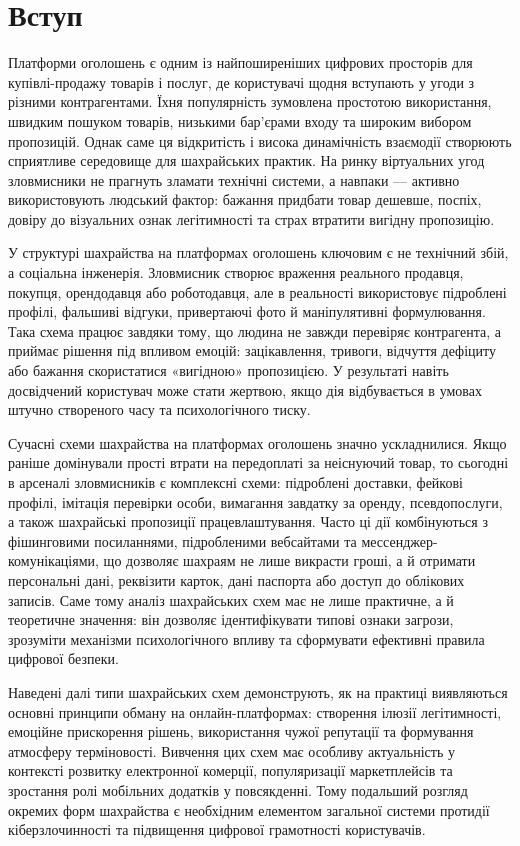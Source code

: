 ﻿\chapter*{Вступ}

\vspace{-1.2em} %


Платформи оголошень є одним із найпоширеніших цифрових просторів для купівлі-продажу товарів і послуг, де користувачі щодня вступають у угоди з різними контрагентами. Їхня популярність зумовлена простотою використання, швидким пошуком товарів, низькими бар’єрами входу та широким вибором пропозицій. Однак саме ця відкритість і висока динамічність взаємодії створюють сприятливе середовище для шахрайських практик. На ринку віртуальних угод зловмисники не прагнуть зламати технічні системи, а навпаки — активно використовують людський фактор: бажання придбати товар дешевше, поспіх, довіру до візуальних ознак легітимності та страх втратити вигідну пропозицію.

У структурі шахрайства на платформах оголошень ключовим є не технічний збій, а соціальна інженерія. Зловмисник створює враження реального продавця, покупця, орендодавця або роботодавця, але в реальності використовує підроблені профілі, фальшиві відгуки, привертаючі фото й маніпулятивні формулювання. Така схема працює завдяки тому, що людина не завжди перевіряє контрагента, а приймає рішення під впливом емоцій: зацікавлення, тривоги, відчуття дефіциту або бажання скористатися «вигідною» пропозицією. У результаті навіть досвідчений користувач може стати жертвою, якщо дія відбувається в умовах штучно створеного часу та психологічного тиску.

\newpage

Сучасні схеми шахрайства на платформах оголошень значно ускладнилися. Якщо раніше домінували прості втрати на передоплаті за неіснуючий товар, то сьогодні в арсеналі зловмисників є комплексні схеми: підроблені доставки, фейкові профілі, імітація перевірки особи, вимагання завдатку за оренду, псевдопослуги, а також шахрайські пропозиції працевлаштування. Часто ці дії комбінуються з фішинговими посиланнями, підробленими вебсайтами та мессенджер-комунікаціями, що дозволяє шахраям не лише викрасти гроші, а й отримати персональні дані, реквізити карток, дані паспорта або доступ до облікових записів. Саме тому аналіз шахрайських схем має не лише практичне, а й теоретичне значення: він дозволяє ідентифікувати типові ознаки загрози, зрозуміти механізми психологічного впливу та сформувати ефективні правила цифрової безпеки.

Наведені далі типи шахрайських схем демонструють, як на практиці виявляються основні принципи обману на онлайн-платформах: створення ілюзії легітимності, емоційне прискорення рішень, використання чужої репутації та формування атмосферу терміновості. Вивчення цих схем має особливу актуальність у контексті розвитку електронної комерції, популяризації маркетплейсів та зростання ролі мобільних додатків у повсякденні. Тому подальший розгляд окремих форм шахрайства є необхідним елементом загальної системи протидії кіберзлочинності та підвищення цифрової грамотності користувачів.


\clearpage
